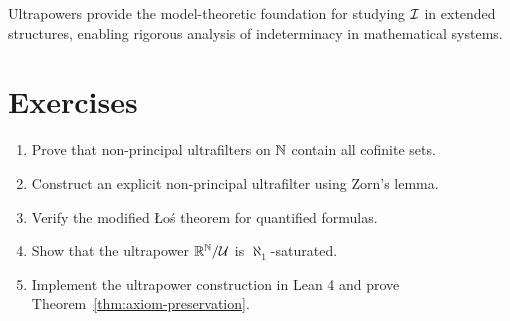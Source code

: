 Ultrapowers provide the model-theoretic foundation for studying $\mathcal{I}$ in extended structures, enabling rigorous analysis of indeterminacy in mathematical systems.

\section{Exercises}

\begin{enumerate}
    \item Prove that non-principal ultrafilters on $\mathbb{N}$ contain all cofinite sets.
    \item Construct an explicit non-principal ultrafilter using Zorn's lemma.
    \item Verify the modified Łoś theorem for quantified formulas.
    \item Show that the ultrapower $\mathbb{R}^{\mathbb{N}}/\mathcal{U}$ is $\aleph_1$-saturated.
    \item Implement the ultrapower construction in Lean 4 and prove Theorem~\ref{thm:axiom-preservation}.
\end{enumerate}
